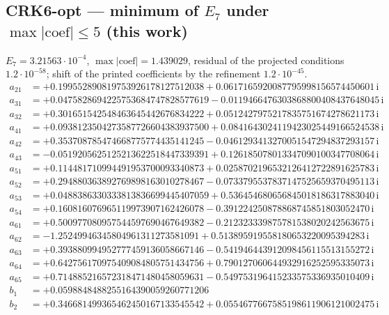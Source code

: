 \subsection*{CRK6-opt --- minimum of $E_7$ under $\max|\text{coef}|\le5$ (this work)}
$E_{7}=3.21563\cdot10^{-4}$, $\max|\text{coef}|=1.439029$, residual of the projected conditions $1.2\cdot10^{-58}$; shift of the printed coefficients by the refinement $1.2\cdot10^{-45}$. 
{\small
\begin{align*}
a_{21} &= +0.199552890819753926178127512038 + 0.0617165920087795998156574450601\,\mathrm{i}\\
a_{31} &= +0.0475828694225753684747828577619 - 0.0119466476303868800408437648045\,\mathrm{i}\\
a_{32} &= +0.301651542548463645442676834222 + 0.0512427975217835751674278621173\,\mathrm{i}\\
a_{41} &= +0.0938123504273587726604383937500 + 0.0841643024119423025449166524538\,\mathrm{i}\\
a_{42} &= +0.353708785474668775774435141245 - 0.0461293413270051547294837293157\,\mathrm{i}\\
a_{43} &= -0.0519205625125213622518447339391 + 0.126185078013347090100347708064\,\mathrm{i}\\
a_{51} &= +0.114481710994491953700093340873 + 0.0258702196532126412722891625783\,\mathrm{i}\\
a_{52} &= +0.294880363892769898163010278467 - 0.0733795537837147525659370495113\,\mathrm{i}\\
a_{53} &= +0.0488386330333813836699445407059 + 0.536454680656845018186317883040\,\mathrm{i}\\
a_{54} &= +0.160816076965119973907162426078 - 0.391224250878868745851803052470\,\mathrm{i}\\
a_{61} &= +0.500977080957544597690467649382 - 0.212323339875781538020242563675\,\mathrm{i}\\
a_{62} &= -1.25249946345804961311273581091 + 0.513895919558180653220095394283\,\mathrm{i}\\
a_{63} &= +0.393880994952777459136058667146 - 0.541946443912098456115513155272\,\mathrm{i}\\
a_{64} &= +0.642756170975409084805751434756 + 0.790127060644932916252595335073\,\mathrm{i}\\
a_{65} &= +0.714885216572318471480458059631 - 0.549753196415233575336935010409\,\mathrm{i}\\[1mm]
b_{1} &= +0.0598848488255164390059260771206\\
b_{2} &= +0.346681499365462450167133545542 + 0.0554677667585198611906121002475\,\mathrm{i}\\

\end{align*}}
